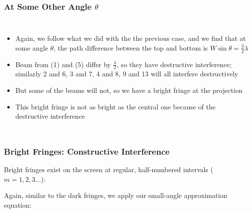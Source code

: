 \documentclass[compress,aspectratio=169]{beamer}
\newcommand{\half}{\ensuremath\frac{1}{2}}
\newcommand{\eq}[2]{\vspace{#1}{\LARGE\begin{displaymath}#2\end{displaymath}}}
\begin{document}
\begin{frame}
  \frametitle{At Some Other Angle $\theta$}
  \begin{columns}
    \begin{itemize}
    \item Again, we follow what we did with the the previous case, and we
      find that at some angle $\theta$, the path difference between the top
      and bottom is $W\sin\theta=\frac{3}{2}\lambda$
    \item Beam from (1) and (5) differ by $\frac{\lambda}{2}$, so they
      have destructive interference; similarly 2 and 6, 3 and 7, 4 and 8,
      9 and 13 will all interfere destructively
    \item But some of the beams will not, so we have a bright fringe at the 
      projection
    \item This bright fringe is not as bright as the central one because
      of the destructive interference
    \end{itemize}
  \end{columns}
\end{frame}



\begin{frame}
  \frametitle{Bright Fringes: Constructive Interference}
  Bright fringes exist on the screen at regular, half-numbered intervals
  ($m=1,2,3\ldots$):

  \eq{-.2in}{
    \boxed{\pm\left(m+\half\right)\lambda=W\sin\theta_m}
  }
  
  \vspace{-.1in}Again, similar to the dark fringes, we apply our small-angle
  approximation equation:

  \eq{-.2in}{
    \boxed{y_m=\pm\left(m+\half\right)\frac{\lambda L}{W}}
  }
\end{frame}
\end{document}
